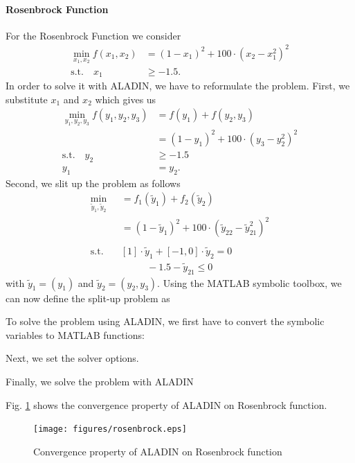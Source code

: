 \documentclass[]{scrartcl}
\begin{document}
\paragraph{Rosenbrock Function} 
For the Rosenbrock Function we consider
\begin{align*}
\min_{x_1, x_2} f(x_1, x_2) &= (1 - x_1)^2 + 100 \cdot (x_2 - x_1^2)^2 \\
\text{s.t.} \quad x_1 & \geq -1.5.
\end{align*}
In order to solve it with ALADIN, we have to reformulate the problem. First, we substitute $x_1$ and $x_2$ which gives us
\begin{align*}
\min_{y_1, y_2, y_3}f(y_1, y_2, y_3) & = f(y_1) + f(y_2, y_3)\\
 & = (1 - y_1)^2 + 100 \cdot (y_3 - y_2^2)^2 \\
\text{s.t.} \quad y_2 & \geq - 1.5\\
y_1 & = y_2. 
\end{align*}
Second, we slit up the problem as follows
\begin{align*}
\min_{\tilde{y}_1, \tilde{y}_2} &= f_1(\tilde{y}_1) + f_2(\tilde{y}_2) \\
& = (1 - \tilde{y}_1)^2 + 100 \cdot (\tilde{y}_{22} - \tilde{y}_{21}^2)^2 \\ 
\\
\text{s.t.} \quad & [1] \cdot \tilde{y}_1 + [-1, 0] \cdot \tilde{y}_2 = 0 \\
\quad \quad & \quad \quad \text{ } -1.5 - \tilde{y}_{21} \leq 0
\end{align*}
with $\tilde{y}_1 = (y_1)$ and $\tilde{y}_2 = (y_2, y_3)$.
Using the MATLAB symbolic toolbox, we can now define the split-up problem 
as 

To solve the problem using ALADIN, we first have to convert the symbolic variables to MATLAB functions:

Next, we set the solver options.

Finally, we solve the problem with ALADIN

Fig. \ref{fig:rosenbrock} shows the convergence property of ALADIN on Rosenbrock function.


\begin{figure}
	\centering
	\texttt{[image: figures/rosenbrock.eps]}
	\caption{Convergence property of ALADIN on Rosenbrock function}
	\label{fig:rosenbrock}
\end{figure}
\end{document}
